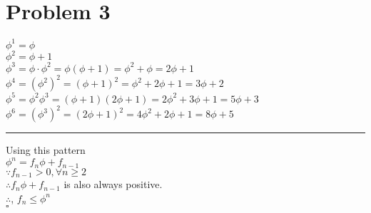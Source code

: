 \section*{Problem 3}
\noindent
$\phi^1=\phi$\\
$\phi^2=\phi+1$\\
$\phi^3=\phi\cdot\phi^2=\phi(\phi+1)=\phi^2+\phi=2\phi+1$\\
$\phi^4=(\phi^2)^2=(\phi+1)^2=\phi^2+2\phi+1=3\phi+2$\\
$\phi^5=\phi^2\phi^3=(\phi+1)(2\phi+1)=2\phi^2+3\phi+1=5\phi+3$\\
$\phi^6=(\phi^3)^2=(2\phi+1)^2=4\phi^2+2\phi+1=8\phi+5$

\begin{center}
\rule{\textwidth}{.1pt}
\end{center}

\noindent
Using this pattern\\
$\phi^n=f_{n}\phi+f_{n-1}$\\
$\because f_{n-1}>0, \forall n\geq2$\\
$\therefore f_n\phi+f_{n-1}$ is also always positive.\\
$\therefore$, $f_n\leq\phi^n$\\
$\square$